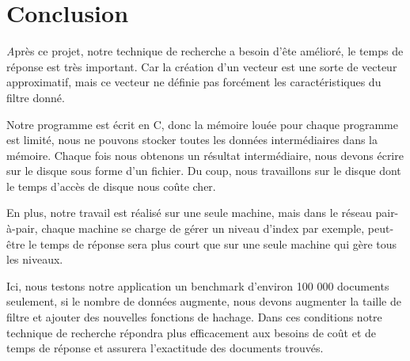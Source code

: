 \chapter{Conclusion}
	{\huge \itshape A}près ce projet, notre technique de recherche a besoin d'ête amélioré, le temps de réponse est très important. Car la création d'un vecteur est une sorte de vecteur approximatif, mais ce vecteur ne définie pas forcément les caractéristiques du filtre donné. 
	
	Notre programme est écrit en C, donc la mémoire louée pour chaque programme est limité, nous ne pouvons stocker toutes les données intermédiaires dans la mémoire. Chaque fois nous obtenons un résultat intermédiaire, nous devons écrire sur le disque sous forme d'un fichier. Du coup, nous travaillons sur le disque dont le temps d'accès de disque nous coûte cher.
	
	En plus, notre travail est réalisé sur une seule machine, mais dans le réseau pair-à-pair, chaque machine se charge de gérer un niveau d'index par exemple, peut-être le temps de réponse sera plus court que sur une seule machine qui gère tous les niveaux.
	
	Ici, nous testons notre application un benchmark d'environ 100 000 documents seulement, si le nombre de données augmente, nous devons augmenter la taille de filtre et ajouter des nouvelles fonctions de hachage. Dans ces conditions notre technique de recherche répondra plus efficacement aux besoins de coût et de temps de réponse et assurera l'exactitude des documents trouvés.
	
	
	
	
	
	
	
	
	
	
	